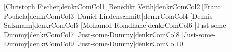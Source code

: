 \newcommand{\dkc}[1]{\dekr{#1}}
%
[Christoph Fischer]{denkrComCol1}%
%
[Benedikt Veith]{denkrComCol2}%
%
[Franc Pouhela]{denkrComCol3}%
%
[Daniel Lindenschmitt]{denkrComCol4}%
%
[Dennis Salzmann]{denkrComCol5}%
%
[Mohamed Romdhane]{denkrComCol6}%
%
[Just-some-Dummy]{denkrComCol7}%
%
[Just-some-Dummy]{denkrComCol8}%
%
[Just-some-Dummy]{denkrComCol9}%
%
[Just-some-Dummy]{denkrComCol10}%
%
